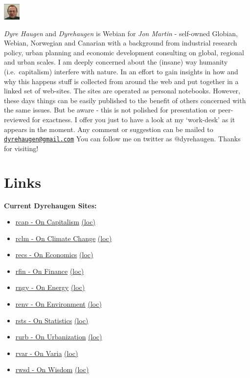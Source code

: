 \documentclass[
]{book}
\providecommand{\tightlist}{%
  \setlength{\itemsep}{0pt}\setlength{\parskip}{0pt}}
\begin{document}
\includegraphics{fig/me.jpg}

\emph{Dyre Haugen} and \emph{Dyrehaugen} is Webian for \emph{Jon Martin} -
self-owned Globian, Webian, Norwegian and Canarian with
a background from industrial research policy, urban planning and
economic development consulting on global, regional and urban scales.
I am deeply concerned about the (insane) way
humanity (i.e.~capitalism) interfere with nature.
In an effort to gain insights in how and why this happens
stuff is collected from around the web and put together
in a linked set of web-sites.
The sites are operated as personal notebooks.
However, these days things can be easily published to the
benefit of others concerned with the same issues.
But be aware - this is not polished for presentation or
peer-reviewed for exactness.
I offer you just to have a look at my `work-desk' as it appears in the moment.
Any comment or suggestion can be mailed to \href{mailto:dyrehaugen@gmail.com}{\nolinkurl{dyrehaugen@gmail.com}}
You can follow me on twitter as @dyrehaugen.
Thanks for visiting!

\hypertarget{links}{%
\chapter{Links}\label{links}}

\textbf{Current Dyrehaugen Sites:}

\begin{itemize}
\tightlist
\item
  \href{https://dyrehaugen.github.io/rcap}{rcap - On Capitalism} \href{http://localhost/rcap}{(loc)}
\item
  \href{https://dyrehaugen.github.io/rclm}{rclm - On Climate Change} \href{http://localhost/rclm}{(loc)}
\item
  \href{https://dyrehaugen.github.io/recs}{recs - On Economics} \href{http://localhost/recs}{(loc)}
\item
  \href{https://dyrehaugen.github.io/rngy}{rfin - On Finance} \href{http://localhost/rfin}{(loc)}
\item
  \href{https://dyrehaugen.github.io/rngy}{rngy - On Energy} \href{http://localhost/rngy}{(loc)}
\item
  \href{https://dyrehaugen.github.io/renv}{renv - On Environment} \href{http://localhost/renv}{(loc)}
\item
  \href{https://dyrehaugen.github.io/rsts}{rsts - On Statistics} \href{http://localhost/rsts}{(loc)}
\item
  \href{https://dyrehaugen.github.io/rurb}{rurb - On Urbanization} \href{http://localhost/rurb}{(loc)}
\item
  \href{https://dyrehaugen.github.io/rvar}{rvar - On Varia} \href{http://localhost/rvar}{(loc)}
\item
  \href{https://dyrehaugen.github.io/rwsd}{rwsd - On Wisdom} \href{http://localhost/rwsd}{(loc)}
\end{itemize}
\end{document}
